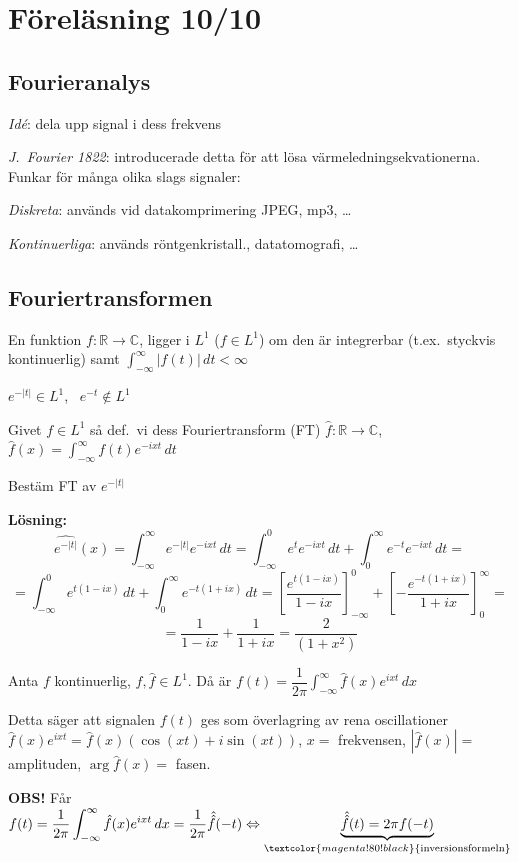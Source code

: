 \section{Föreläsning 10/10}
\subsection{Fourieranalys}
\emph{Idé}: dela upp signal i dess frekvens

\emph{J.\ Fourier 1822}: introducerade detta för att lösa värmeledningsekvationerna. Funkar för många olika slags signaler:

\emph{Diskreta}: används vid datakomprimering JPEG, mp3, \dots

\emph{Kontinuerliga}: används röntgenkristall., datatomografi, \dots

\subsection{Fouriertransformen}
\begin{definition}
En funktion $f : \mathbb{R} \to \mathbb{C}$, ligger i $L^1$ ($f \in L^1$) om den är integrerbar (t.ex.\ styckvis kontinuerlig) samt $\displaystyle\int_{-\infty}^\infty |f(t)|\,dt < \infty$
\end{definition}

\begin{example}
$e^{-|t|} \in L^1$, \ $e^{-t} \notin L^1$
\end{example}

\begin{definition}
Givet $f \in L^1$ så def.\ vi dess Fouriertransform (FT) $\hat{f} : \mathbb{R} \to \mathbb{C}$, $\hat{f}(x) = \displaystyle\int_{-\infty}^\infty f(t)e^{-ixt}\,dt$
\end{definition}

\begin{example}
Bestäm FT av $e^{-|t|}$

\textbf{Lösning:}
\[ \widehat{e^{-|t|}}(x) = \int_{-\infty}^\infty e^{-|t|}e^{-ixt}\,dt = \int_{-\infty}^0 e^t e^{-ixt}\,dt + \int_0^\infty e^{-t}e^{-ixt}\,dt = \]
\[ = \int_{-\infty}^0 e^{t(1 - ix)}\,dt + \int_0^\infty e^{-t(1 + ix)}\,dt = \left[ \frac{e^{t(1 - ix)}}{1 - ix} \right]_{-\infty}^0 + \left[ -\frac{e^{-t(1 + ix)}}{1 + ix} \right]_0^\infty = \]
\[ = \frac{1}{1 - ix} + \frac{1}{1 + ix} = \frac{2}{(1 + x^2)} \]
\end{example}

\begin{theorem}
Anta $f$ kontinuerlig, $f, \hat{f} \in L^1$. Då är $f(t) = \dfrac{1}{2\pi} \displaystyle\int_{-\infty}^\infty \hat{f}(x)e^{ixt}\,dx$
\end{theorem}

Detta säger att signalen $f(t)$ ges som överlagring av rena oscillationer $\hat{f}(x)e^{ixt} = \hat{f}(x)(\cos(xt) + i\sin(xt))$, $x = $ frekvensen, $|\hat{f}(x)| = $ amplituden, $\arg \hat{f}(x) = $ fasen.

\textcolor{red!70!black}{\textbf{OBS!}} Får $f(t) = \dfrac{1}{2\pi} \displaystyle\int_{-\infty}^\infty \hat{f}(x)e^{ixt}\,dx = \frac{1}{2\pi} \hat{\hat{f}}(-t) \Leftrightarrow \underbrace{\hat{\hat{f}}(t) = 2\pi f(-t)}_{\textcolor{magenta!80!black}{\text{inversionsformeln}}}$
